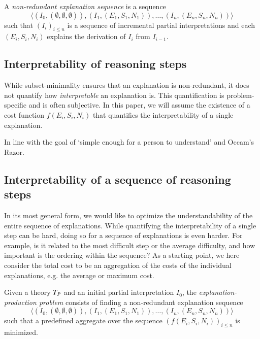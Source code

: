 \begin{definition} \label{def:nonred}
A \emph{non-redundant explanation sequence} is a sequence 
\[\langle(I_0,(\emptyset,\emptyset,\emptyset)), (I_1,(E_1,S_1,N_1)), \dots ,(I_n,(E_n,S_n,N_n))\rangle\]
such that $(I_i)_{i\leq n}$ is a sequence of incremental partial interpretations and each $(E_i,S_i,N_i)$ explains the derivation of $I_i$ from $I_{i-1}$.
\end{definition} 

\subsection{Interpretability of reasoning steps}
While subset-minimality ensures that an explanation is non-redundant, it does not quantify how \textit{interpretable} an explanation is. 
This quantification is problem-specific and is often subjective. 
In this paper, we will assume the existence of a cost function $f(E_i,S_i,N_i)$ that quantifies the interpretability of a single explanation. 

In line with the goal of `simple enough for a person to understand' and Occam's Razor.

\subsection{Interpretability of a sequence of reasoning steps}
In its most general form, we would like to optimize the understandability of the entire sequence of explanations. 
While quantifying the interpretability of a single step can be hard, doing so for a sequence of explanations is even harder. For example, is it related to the most difficult step or the average difficulty, and how important is the ordering within the sequence?
As a starting point, we here consider the total cost to be an aggregation of the costs of the individual explanations, e.g. the average or maximum cost.

\begin{definition}
Given a theory $T_P$ and an initial partial interpretation $I_0$, the \emph{explanation-production problem} consists of finding a non-redundant explanation sequence
\[\langle(I_0,(\emptyset,\emptyset,\emptyset)), (I_1,(E_1,S_1,N_1)), \dots ,(I_n,(E_n,S_n,N_n))\rangle\]
such that a predefined aggregate over the sequence $\left(f(E_i,S_i,N_i)\right)_{i\leq n}$ is minimized.
\end{definition} 

